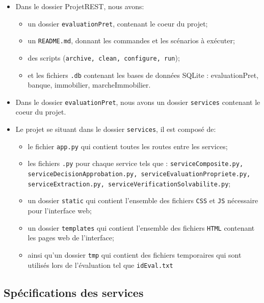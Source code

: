 \documentclass{article}
\begin{document}
    \begin{itemize}
    
        \item Dans le dossier ProjetREST, nous avons:
        \begin{itemize}
            \item un dossier \texttt{evaluationPret}, contenant le coeur du projet;
            \item un \texttt{README.md}, donnant les commandes et les scénarios à exécuter;
            \item des scripts (\texttt{archive, clean, configure, run});
            \item et les fichiers \texttt{.db} contenant les bases de données SQLite : evaluationPret, banque, immobilier, marcheImmobilier.
        \end{itemize}
    
        \item Dans le dossier \texttt{evaluationPret},  nous avons un dossier \texttt{services} contenant le coeur du projet. 
        
        \item Le projet se situant dans le dossier \texttt{services}, il est composé de:
        \begin{itemize}
            \item le fichier \texttt{app.py} qui contient toutes les routes entre les services;
            \item les fichiers \texttt{.py} pour chaque service tels que : \texttt{serviceComposite.py, serviceDecisionApprobation.py, serviceEvaluationPropriete.py, serviceExtraction.py, serviceVerificationSolvabilite.py};
          \item un dossier \texttt{static} qui contient l'ensemble des fichiers \texttt{CSS} et \texttt{JS} nécessaire pour l'interface web;
          \item un dossier \texttt{templates} qui contient l'ensemble des fichiers \texttt{HTML} contenant les pages web de l'interface;
          \item ainsi qu'un dossier \texttt{tmp} qui contient des fichiers temporaires qui sont utilisés lors de l'évaluation tel que \texttt{idEval.txt}
        \end{itemize}

    \end{itemize}

    
    \subsection{Spécifications des services}
    
\end{document}
